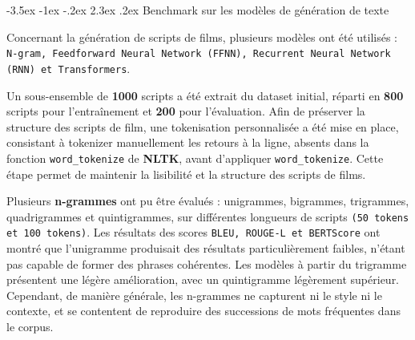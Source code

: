 \documentclass[12pt]{report}
\makeatletter
\renewcommand{\chapter}{\@startsection{chapter}{0}{\z@}
  {-3.5ex \@plus -1ex \@minus -.2ex}
  {2.3ex \@plus.2ex}
  {\normalfont\LARGE\bfseries}}
\makeatother
\begin{document}
\vspace{1.5\baselineskip}

\chapter{Benchmark sur les modèles de génération de texte}

\begin{table}[H]
\renewcommand{\arraystretch}{1.5}
\centering
{}
\caption{Scores des modèles de génération de texte}
\label{tab:generation_scores}
\end{table}



Concernant la génération de scripts de films, plusieurs modèles ont été utilisés : \texttt{N-gram, Feedforward Neural Network (FFNN), Recurrent Neural Network (RNN) et Transformers}. 

Un sous-ensemble de \textbf{1000} scripts a été extrait du dataset initial, réparti en \textbf{800} scripts pour l'entraînement et \textbf{200} pour l'évaluation. Afin de préserver la structure des scripts de film, une tokenisation personnalisée a été mise en place, consistant à tokenizer manuellement les retours à la ligne, absents dans la fonction \texttt{word\_tokenize} de \textbf{NLTK}, avant d’appliquer \texttt{word\_tokenize}. Cette étape permet de maintenir la lisibilité et la structure des scripts de films. 

Plusieurs \textbf{n-grammes} ont pu être évalués : unigrammes, bigrammes, trigrammes, quadrigrammes et quintigrammes, sur différentes longueurs de scripts \texttt{(50 tokens et 100 tokens)}. Les résultats des scores \texttt{BLEU, ROUGE-L et BERTScore} ont montré que l’unigramme produisait des résultats particulièrement faibles, n'étant pas capable de former des phrases cohérentes. Les modèles à partir du trigramme présentent une légère amélioration, avec un quintigramme légèrement supérieur. Cependant, de manière générale, les n-grammes ne capturent ni le style ni le contexte, et se contentent de reproduire des successions de mots fréquentes dans le corpus. 
\end{document}
